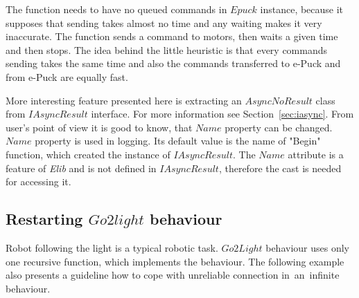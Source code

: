   The function needs to have no queued commands in $Epuck$ instance, 
  because it supposes that sending takes almost no time and any waiting makes it very inaccurate.
  The function sends a command to motors, then waits a given time and then stops.
  The idea behind the little heuristic is that every commands sending takes the 
  same time and also the commands transferred to e-Puck and from e-Puck are equally fast.

  More interesting feature presented here is extracting 
  an $AsyncNoResult$ class from $IAsyncResult$ interface. 
  For more information see Section~\ref{sec:iasync}.
  From user's point of view it is good to know, that $Name$ property can be changed. 
  $Name$ property is used in logging. 
  Its default value is the name of "Begin" function,
  which created the instance of $IAsyncResult$. The $Name$ attribute is a feature of {\it Elib} 
  and is not defined in $IAsyncResult$, therefore the cast is needed for accessing it.

\subsection{Restarting $Go2light$ behaviour}\label{sec:go2light}
  Robot following the light is a typical robotic task. $Go2Light$ behaviour uses only one recursive function, which implements the behaviour.
  The following example also presents a guideline how to cope with unreliable connection 
  in~an~infinite behaviour.

